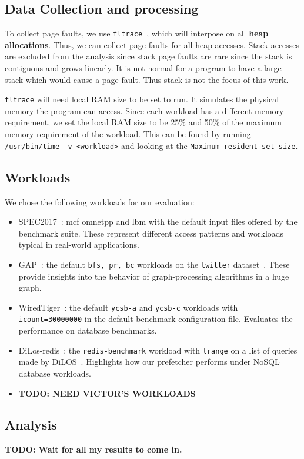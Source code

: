 \subsection{Data Collection and processing}

To collect page faults, we use \texttt{fltrace}~\cite{fltrace}, which will interpose on all \textbf{heap allocations}. Thus, we can collect page faults for all heap accesses. Stack accesses are excluded from the analysis since stack page faults are rare since the stack is contiguous and grows linearly. It is not normal for a program to have a large stack which would cause a page fault. Thus stack is not the focus of this work.

\texttt{fltrace} will need local RAM size to be set to run. It simulates the physical memory the program can access. Since each workload has a different memory requirement, we set the local RAM size to be 25\% and 50\% of the maximum memory requirement of the workload. This can be found by running \texttt{/usr/bin/time -v <workload>} and looking at the \texttt{Maximum resident set size}.

\subsection{Workloads}
We chose the following workloads for our evaluation:\begin{itemize}
    \item SPEC2017~\cite{SPEC2017}: mcf omnetpp and lbm with the default input files offered by the benchmark suite. These represent different access patterns and workloads typical in real-world applications.
    \item GAP~\cite{gapbs}: the default \texttt{bfs, pr, bc} workloads on the \texttt{twitter} dataset~\cite{twitter-dataset}. These provide insights into the behavior of graph-processing algorithms in a huge graph.
    \item WiredTiger~\cite{wiredtiger}: the default \texttt{ycsb-a} and \texttt{ycsb-c} workloads with \texttt{icount=30000000} in the default benchmark configuration file. Evaluates the performance on database benchmarks.
    \item DiLos-redis~\cite{redis, dilos}: the \texttt{redis-benchmark} workload with \texttt{lrange} on a list of queries made by DiLOS~\cite{dilos}. Highlights how our prefetcher performs under NoSQL database workloads.
    \item \textbf{TODO: NEED VICTOR'S WORKLOADS}
\end{itemize}

\subsection{Analysis}

\textbf{TODO: Wait for all my results to come in.}


